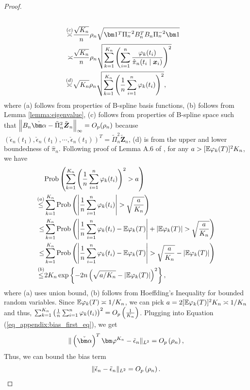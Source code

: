 \begin{proof}
\begin{equation}
\begin{split}
\\\overset{(c)}{\asymp}&\frac{\sqrt{K_n}}{n}\rho_n\sqrt{\vecI^T\Pi_n^{-2}B_n^TB_n\Pi_n^{-2}\vecI}
\\\asymp&\frac{\sqrt{K_n}}{n}\rho_n\sqrt{\sum_{k=1}^{K_n}\left(\sum_{i=1}^n\frac{\varphi_k(t_i)}{\hat\pi_n(t_i\mid\x_i)}\right)^2}
\\\overset{(d)}{\asymp}&\sqrt{K_n}\rho_n\sqrt{\sum_{k=1}^{K_n}\left(\frac{1}{n}\sum_{i=1}^n\varphi_k(t_i)\right)^2},
\end{split}
\end{equation}
where (a) follows from properties of B-spline basis functions, (b) follows from Lemma \ref{lemma:eigenvalue}, (c) follows from properties of B-spline space such that $\left\|B_n\bmalpha-\tilde\Pi_n^{2}\tilde{\boldsymbol{Z}}_n\right\|_{\infty}=\O_p(\rho_n)$  because $\left(\check\epsilon_n(t_1),\check\epsilon_n(t_1),\cdots,\check\epsilon_n(t_1)\right)^T=\tilde\Pi_n^{2}\tilde{\boldsymbol{Z}}_n$, (d) is from the upper and lower boundedness of $\hat\pi_n$.
Following proof of Lemma A.6 of \cite{huang2004polynomial}, for any $a>[\mathbb{E}\varphi_k(T)]^2K_n$, we have
\begin{equation*}
\begin{split}
&{\Pr}\left(\sum_{k=1}^{K_n}\left(\frac{1}{n}\sum_{i=1}^n\varphi_k(t_i)\right)^2>a\right)
\\\overset{(a)}{\leq}&\sum_{k=1}^{K_n}\Pr\left(\left|\frac{1}{n}\sum_{i=1}^n\varphi_k(t_i)\right|>\sqrt{\frac{a}{K_n}}\right)
\\\leq&\sum_{k=1}^{K_n}\Pr\left(\left|\frac{1}{n}\sum_{i=1}^n\varphi_k(t_i)-\E\varphi_k(T)\right|+\left|\E\varphi_k(T)\right|>\sqrt{\frac{a}{K_n}}\right)
\\\leq&\sum_{k=1}^{K_n}\Pr\left(\left|\frac{1}{n}\sum_{i=1}^n\varphi_k(t_i)-\E\varphi_k(T)\right|>\sqrt{\frac{a}{K_n}}-\left|\E\varphi_k(T)\right|\right)
\\\overset{(b)}{\leq}& %
2K_n\exp\left\{-2n\left(\sqrt{a/K_n}-|\E\varphi_k(T)|\right)^2\right\},
\end{split}
\end{equation*}
where (a) uses union bound, (b) follows from Hoeffding's Inequality for bounded random variables. Since $\mathbb{E}\varphi_k(T)\asymp 1/K_n$, we can pick $a=2[\mathbb{E}\varphi_k(T)]^2K_n\asymp 1/K_n$ and thus, $\sum_{k=1}^{K_n}\left(\frac{1}{n}\sum_{i=1}^n\varphi_k(t_i)\right)^2=O_p\left(\frac{1}{K_n}\right)$. Plugging into Equation (\ref{eq_appendix:bias_first_eq}), we get
$$
\|\left(\bmalpha\right)^T\vpk-\tilde\epsilon_n\|_{L^2}
=\O_p\left(\rho_n\right),
$$
Thus, we can bound the bias term
\[
\|\check\epsilon_n-\tilde{\epsilon}_n\|_{L^2}
=O_p\left(\rho_n\right).
\]



\end{proof}

